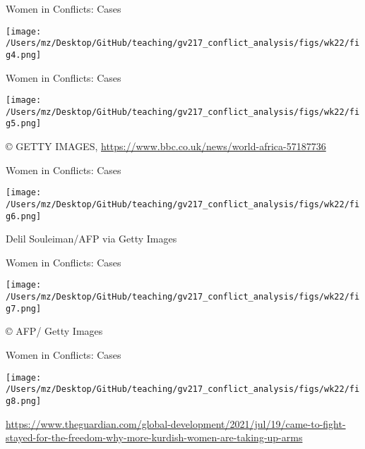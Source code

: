 \documentclass[handout]{beamer}
\begin{document}
\begin{frame}{Women in Conflicts: Cases}
    \pause
    \begin{center}
        \texttt{[image: /Users/mz/Desktop/GitHub/teaching/gv217\_conflict\_analysis/figs/wk22/fig4.png]}
    \end{center}
\end{frame}

\begin{frame}{Women in Conflicts: Cases}
    \pause
    \begin{center}
        \texttt{[image: /Users/mz/Desktop/GitHub/teaching/gv217\_conflict\_analysis/figs/wk22/fig5.png]}
    \end{center}
    \tiny © GETTY IMAGES, \url{https://www.bbc.co.uk/news/world-africa-57187736}
\end{frame}

\begin{frame}{Women in Conflicts: Cases}
    \pause
    \begin{center}
        \texttt{[image: /Users/mz/Desktop/GitHub/teaching/gv217\_conflict\_analysis/figs/wk22/fig6.png]}
    \end{center}
    \tiny Delil Souleiman/AFP via Getty Images
\end{frame}

\begin{frame}{Women in Conflicts: Cases}
    \pause
    \begin{center}
        \texttt{[image: /Users/mz/Desktop/GitHub/teaching/gv217\_conflict\_analysis/figs/wk22/fig7.png]}
    \end{center}
    \tiny © AFP/ Getty Images
\end{frame}

\begin{frame}{Women in Conflicts: Cases}
    \pause
    \begin{center}
        \texttt{[image: /Users/mz/Desktop/GitHub/teaching/gv217\_conflict\_analysis/figs/wk22/fig8.png]}
    \end{center}
    \tiny \url{https://www.theguardian.com/global-development/2021/jul/19/came-to-fight-stayed-for-the-freedom-why-more-kurdish-women-are-taking-up-arms}
\end{frame}
\end{document}
